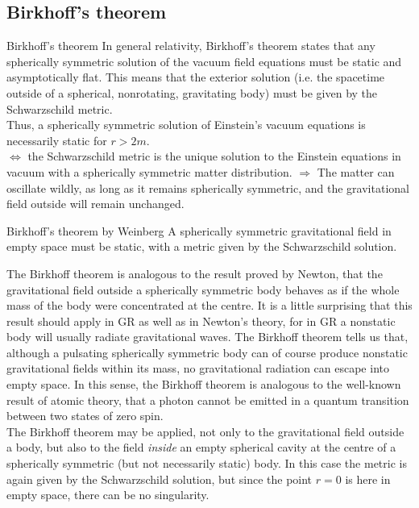\subsection{Birkhoff's theorem}
\label{subsubsec:BirkhoffTheorem}
\begin{mybox}{Birkhoff's theorem}
	In general relativity, Birkhoff's theorem states that any spherically symmetric solution of the vacuum field equations must be static and asymptotically flat. This means that the exterior solution (i.e. the spacetime outside of a spherical, nonrotating, gravitating body) must be given by the Schwarzschild metric.\\
	Thus, a spherically symmetric solution of Einstein's vacuum equations is necessarily static for $r>2m$.\\
	 $\Leftrightarrow$ the Schwarzschild metric is the unique solution to the Einstein equations in vacuum with a spherically symmetric matter distribution.
	 $\Rightarrow$ The matter can oscillate wildly, as long as it remains spherically symmetric, and the gravitational field outside will remain unchanged.
\end{mybox}
\begin{mybox}{Birkhoff's theorem by Weinberg}
	A spherically symmetric gravitational field in empty space must be static, with a metric given by the Schwarzschild solution.
\end{mybox}
The Birkhoff theorem is analogous to the result proved by Newton, that the gravitational field outside a spherically symmetric body behaves as if the whole mass of the body were concentrated at the centre. It is a little surprising that this result should apply in GR as well as in Newton's theory, for in GR a nonstatic body will usually radiate gravitational waves. The Birkhoff theorem tells us that, although a pulsating spherically symmetric body can of course produce nonstatic gravitational fields within its mass, no gravitational radiation can escape into empty space. In this sense, the Birkhoff theorem is analogous to the well-known result of atomic theory, that a photon cannot be emitted in a quantum transition between two states of zero spin.\\
The Birkhoff theorem may be applied, not only to the gravitational field outside a body, but also to the field \emph{inside} an empty spherical cavity at the centre of a spherically symmetric (but not necessarily static) body. In this case the metric is again given by the Schwarzschild solution, but since the point $r=0$ is here in empty space, there can be no singularity.
